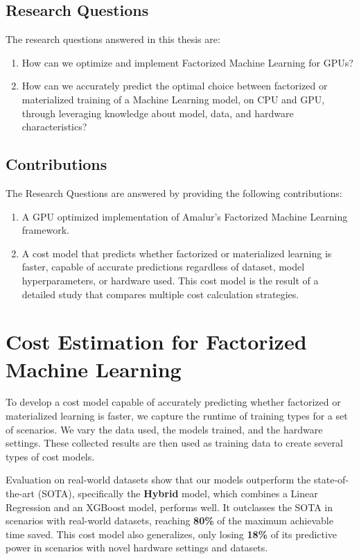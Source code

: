 \subsection{Research Questions}
The research questions answered in this thesis are:
\begin{enumerate}[leftmargin=1.5cm, label=\emph{RQ.\arabic*}]
  \item How can we optimize and implement Factorized Machine Learning for GPUs?
  \item How can we accurately predict the optimal choice between factorized or materialized training of a Machine Learning model, on CPU and GPU, through leveraging knowledge about model, data, and hardware characteristics?
\end{enumerate}

\subsection{Contributions}
The Research Questions are answered by providing the following contributions:
\begin{enumerate}[leftmargin=1.5cm, label=\emph{C.\arabic*}]
  \item A GPU optimized implementation of Amalur's Factorized Machine Learning framework.
  \item A cost model that predicts whether factorized or materialized learning is faster, capable of accurate predictions regardless of dataset, model hyperparameters, or hardware used. This cost model is the result of a detailed study that compares multiple cost calculation strategies.
\end{enumerate}

\section{Cost Estimation for Factorized Machine Learning}
To develop a cost model capable of accurately predicting whether factorized or materialized learning is faster, we capture the runtime of training types for a set of scenarios. We vary the data used, the models trained, and the hardware settings. These collected results are then used as training data to create several types of cost models.

Evaluation on real-world datasets show that our models outperform the state-of-the-art (SOTA), specifically the \textbf{Hybrid} model, which combines a Linear Regression and an XGBoost model, performs well. It outclasses the SOTA in scenarios with real-world datasets, reaching \textbf{80\%} of the maximum achievable time saved. This cost model also generalizes, only losing \textbf{18\%} of its predictive power in scenarios with novel hardware settings and datasets.

